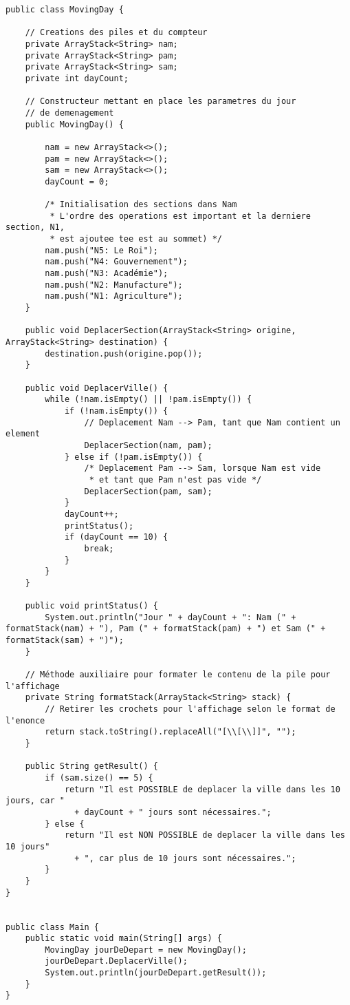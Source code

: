 \documentclass[10pt]{report}
\begin{document}
\begin{lstlisting}[style=JavaDraculaWhite]
 public class MovingDay {

    // Creations des piles et du compteur 
    private ArrayStack<String> nam;
    private ArrayStack<String> pam;
    private ArrayStack<String> sam;
    private int dayCount;

    // Constructeur mettant en place les parametres du jour
    // de demenagement
    public MovingDay() {

        nam = new ArrayStack<>();
        pam = new ArrayStack<>();
        sam = new ArrayStack<>();
        dayCount = 0;

        /* Initialisation des sections dans Nam 
         * L'ordre des operations est important et la derniere section, N1, 
         * est ajoutee tee est au sommet) */
        nam.push("N5: Le Roi");
        nam.push("N4: Gouvernement");
        nam.push("N3: Académie");
        nam.push("N2: Manufacture");
        nam.push("N1: Agriculture");
    }

    public void DeplacerSection(ArrayStack<String> origine, ArrayStack<String> destination) {
        destination.push(origine.pop());
    }

    public void DeplacerVille() {
        while (!nam.isEmpty() || !pam.isEmpty()) {
            if (!nam.isEmpty()) {
                // Deplacement Nam --> Pam, tant que Nam contient un element
                DeplacerSection(nam, pam);
            } else if (!pam.isEmpty()) {
                /* Deplacement Pam --> Sam, lorsque Nam est vide 
                 * et tant que Pam n'est pas vide */
                DeplacerSection(pam, sam);
            }
            dayCount++;
            printStatus();
            if (dayCount == 10) {
                break;
            }
        }
    }

    public void printStatus() {
        System.out.println("Jour " + dayCount + ": Nam (" + formatStack(nam) + "), Pam (" + formatStack(pam) + ") et Sam (" + formatStack(sam) + ")");
    }

    // Méthode auxiliaire pour formater le contenu de la pile pour l'affichage
    private String formatStack(ArrayStack<String> stack) {
        // Retirer les crochets pour l'affichage selon le format de l'enonce
        return stack.toString().replaceAll("[\\[\\]]", ""); 
    }

    public String getResult() {
        if (sam.size() == 5) {
            return "Il est POSSIBLE de deplacer la ville dans les 10 jours, car " 
              + dayCount + " jours sont nécessaires.";
        } else {
            return "Il est NON POSSIBLE de deplacer la ville dans les 10 jours" 
              + ", car plus de 10 jours sont nécessaires.";
        }
    }
}


public class Main {
    public static void main(String[] args) {
        MovingDay jourDeDepart = new MovingDay();
        jourDeDepart.DeplacerVille();
        System.out.println(jourDeDepart.getResult());
    }
}
\end{lstlisting}
\end{document}
